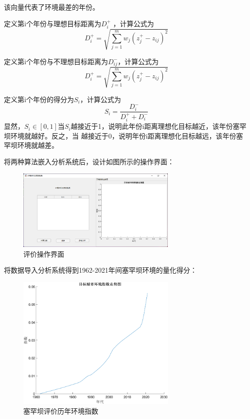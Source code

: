 \documentclass[UTF8]{ctexart}
\begin{document}
该向量代表了环境最差的年份。

定义第i个年份与理想目标距离为$D_i^+$ ，计算公式为
\begin{equation}
    D_i^+=\sqrt{\sum_{j=1}^{m}{w_j(z_j^+-z_{ij})^2}}
\end{equation}

定义第i个年份与不理想目标距离为$D_{ij}^-$，计算公式为
\begin{equation}
    D_i^+=\sqrt{\sum_{j=1}^{m}{w_j(z_j^+-z_{ij})^2}}
\end{equation}

定义第i个年份的得分为$S_i$，计算公式为
\begin{equation}
    S_i=\frac{D_i^-}{D_i^++D_i^-}
\end{equation}
显然，$S_i\in[0,1]$当$S_i$越接近于1，说明此年份i距离理想化目标越近，该年份塞罕坝环境就越好。反之，当 越接近于0，说明年份i距离理想化目标越远，该年份塞罕坝环境就越差。

\newpage
将两种算法嵌入分析系统后，设计如图所示的操作界面：

\begin{figure}[H] %
    \centering %
    \includegraphics[width=0.7\textwidth]{./picture/caozuojiemian1.png} %
    \caption{评价操作界面} 
\end{figure}

将数据导入分析系统得到1962-2021年间塞罕坝环境的量化得分：

\begin{figure}[H] %
    \centering %
    \includegraphics[width=0.7\textwidth]{saihanba.png} %
    \caption{塞罕坝评价历年环境指数} 
\end{figure}
\end{document}
